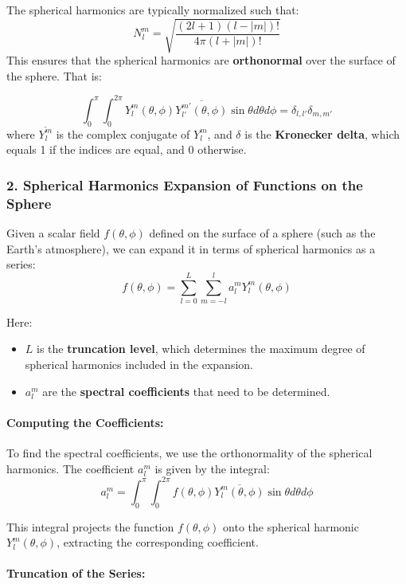 The spherical harmonics are typically normalized such that:
$$N_l^m=\sqrt{\frac{(2l+1)(l-|m|)!}{4\pi(l+|m|)!}}$$
This ensures that the spherical harmonics are \textbf{orthonormal} over the surface of the sphere. That is:

$$\int_0^{\pi}\int_0^{2\pi}Y_l^m(\theta, \phi)\overline{Y_{l'}^{m'}(\theta,\phi)}\sin\theta d\theta d\phi=\delta_{l,l'}\delta_{m,m'}$$ where $\overline{Y_l^m}$
is the complex conjugate of $Y_l^m$, and $\delta$ is the \textbf{Kronecker delta}, which equals 1 if the indices are equal, and 0 otherwise.

\subsubsection{2. \textbf{Spherical Harmonics Expansion of Functions on the Sphere}}

Given a scalar field $f(\theta,\phi)$ defined on the surface of a sphere (such as the Earth's atmosphere), we can expand it in terms of spherical harmonics as a series:
$$f(\theta,\phi)=\displaystyle\sum_{l=0}^L\displaystyle\sum_{m=-l}^{l}a_l^mY_l^m(\theta,\phi)$$

Here:

\begin{itemize}
	\item $L$ is the \textbf{truncation level}, which determines the maximum degree of spherical harmonics included in the expansion.
	\item $a_l^m$ are the \textbf{spectral coefficients} that need to be determined.
\end{itemize}

\paragraph{\textbf{Computing the Coefficients}:}

To find the spectral coefficients, we use the orthonormality of the spherical harmonics. The coefficient $a_l^m$ is given by the integral:
$$a_l^m=\int_0^\pi\int_0^{2\pi}f(\theta,\phi)\overline{Y_l^m(\theta,\phi)}\sin\theta d\theta d\phi$$

This integral projects the function $f(\theta,\phi)$ onto the spherical harmonic $Y_l^m(\theta,\phi)$, extracting the corresponding coefficient.

\paragraph{\textbf{Truncation of the Series}:}


